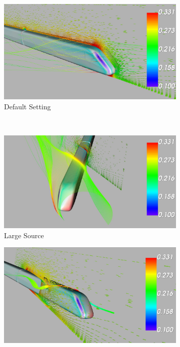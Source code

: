 \documentclass[
	12pt, %
]{fphw}
\begin{document}
\begin{enumerate}[(\itshape 1\normalfont)]
\begin{figure}[h]
    \centering
    \begin{subfigure}[h]{0.45\textwidth}
        \includegraphics[width=\textwidth]{6b.jpg}
        \caption{Default Setting}
        \label{fig:1c1}
    \end{subfigure}
    ~ 
    \begin{subfigure}[h]{0.45\textwidth}
        \includegraphics[width=\textwidth]{6c.jpg}
        \caption{Large Source}
        \label{fig:1c1}
    \end{subfigure}
    \caption{ParaView Measurement}\label{fig:1c}
     \begin{subfigure}[h]{0.45\textwidth}
        \includegraphics[width=\textwidth]{6d.jpg}

\end{subfigure}
\end{figure}
\end{enumerate}
\end{document}
